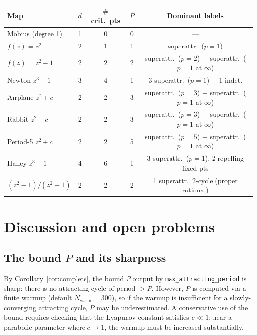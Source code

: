 \documentclass[12pt]{article}
\theoremstyle{definition}
\begin{document}
\begin{center}
\begin{tabular}{lcccc}
\toprule
Map & $d$ & $\#$ crit.\ pts & $P$ & Dominant labels\\
\midrule
M\"obius (degree 1)  & 1 & 0  & 0 & --- \\
$f(z)=z^2$         & 2 & 1  & 1 & superattr.\ ($p=1$) \\
$f(z)=z^2-1$       & 2 & 2  & 2 & superattr.\ ($p=2$) + superattr.\ ($p=1$ at $\infty$) \\
Newton $z^3-1$     & 3 & 4  & 1 & 3 superattr.\ ($p=1$) + 1 indet. \\
Airplane $z^2+c$   & 2 & 2  & 3 & superattr.\ ($p=3$) + superattr.\ ($p=1$ at $\infty$) \\
Rabbit $z^2+c$     & 2 & 2  & 3 & superattr.\ ($p=3$) + superattr.\ ($p=1$ at $\infty$) \\
Period-5 $z^2+c$   & 2 & 2  & 5 & superattr.\ ($p=5$) + superattr.\ ($p=1$ at $\infty$) \\
Halley $z^3-1$     & 4 & 6  & 1 & 3 superattr.\ ($p=1$), 2 repelling fixed pts \\
$(z^2-1)/(z^2+1)$  & 2 & 2  & 2 & 1 superattr.\ $2$-cycle (proper rational) \\
\bottomrule
\end{tabular}
\end{center}

\section{Discussion and open problems}
\label{sec:discussion}

\subsection{The bound $P$ and its sharpness}

By Corollary~\ref{cor:complete}, the bound $P$ output by
\texttt{max\_attracting\_period} is sharp: there is no attracting cycle
of period $>P$.  However, $P$ is computed via a finite warmup (default
$N_{\mathrm{warm}}=300$), so if the warmup is insufficient for a
slowly-converging attracting cycle, $P$ may be underestimated.
A conservative use of the bound requires checking that the
Lyapunov constant satisfies $c\ll 1$; near a parabolic
parameter where $c\to 1$, the warmup must be increased substantially.
\end{document}
